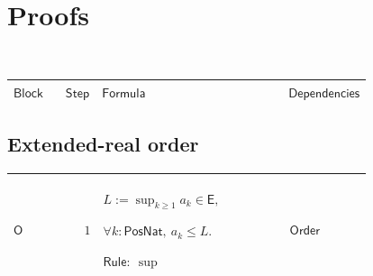 \documentclass[12pt,reqno]{amsart}
\theoremstyle{blueplain}
\numberwithin{equation}{section}
\newlength{\FATOUOneColumnBody}
\begin{document}
{\scriptsize \ }

\section{\protect\scriptsize Proofs}

{\scriptsize {\ }}

{\scriptsize \setlength{\parskip}{0pt}\nointerlineskip
\noindent 
\begin{tabular}{|@{}>{\centering\arraybackslash}m{\FATOUOneColumnBody}|}
\hline
$\displaystyle \mathsf{Proofs}$ \\ \hline
\end{tabular}%
}

{\scriptsize \setlength{\parskip}{0pt}\nointerlineskip
\noindent 
\begin{tabular}{|@{}>{\centering\arraybackslash}m{0.10658\linewidth}|>{\centering\arraybackslash}m{0.03553\linewidth}|>{\centering\arraybackslash}m{0.52105\linewidth}|>{\centering\arraybackslash}m{0.23684\linewidth}|}
\hline
$\displaystyle \mathsf{Block}$ & $\displaystyle \mathsf{Step}$ & $%
\displaystyle \mathsf{Formula}$ & $\displaystyle \mathsf{Dependencies}$ \\ 
\hline
\end{tabular}%
}

\subsection{\protect\scriptsize Extended-real order}

{\scriptsize \setlength{\parskip}{0pt}\nointerlineskip
\noindent 
\begin{tabular}{|@{}>{\centering\arraybackslash}m{\FATOUOneColumnBody}|}
\hline
$\displaystyle \mathsf{Context\_O}:=$\par$\displaystyle a:\mathsf{PosNat}\to%
\mathsf{E},\quad\mathsf{Mono}(a).$ \\ \hline
\end{tabular}%
}

{\scriptsize \setlength{\parskip}{0pt}\nointerlineskip
\noindent 
\begin{tabular}{|@{}>{\centering\arraybackslash}m{0.10658\linewidth}|>{\centering\arraybackslash}m{0.03553\linewidth}|>{\centering\arraybackslash}m{0.52105\linewidth}|>{\centering\arraybackslash}m{0.23684\linewidth}|}
\hline
\hypertarget{proof:O1}{$\displaystyle \mathsf{O}$} & $\displaystyle 1$ & $%
\displaystyle L:=\sup_{k\ge1}a_k\in\mathsf{E},$\par$\displaystyle \forall k:%
\mathsf{PosNat},\ a_k\le L.$\par$\displaystyle \mathsf{Rule}:\ \sup$ & 
\hyperlink{ax:Order}{$\displaystyle \mathsf{Order}$} \\ \hline
\end{tabular}%
}
\end{document}
